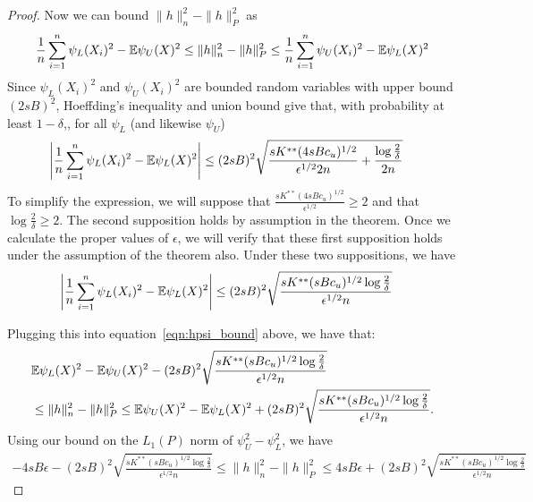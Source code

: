 \begin{proof}
Now we can bound $\| h \|_n^2 - \| h \|_P^2$ as
\begin{align}
\frac{1}{n} \sum_{i=1}^n \psi_L(X_i)^2 - {\mathbb E} \psi_U(X)^2  \leq
    \| h \|_n^2 - \| h \|_P^2 \leq
  \frac{1}{n} \sum_{i=1}^n \psi_U(X_i)^2 - {\mathbb E} \psi_L(X)^2  \label{eqn:hpsi_bound}
\end{align}
Since 
$\psi_L(X_i)^2$ and $\psi_U(X_i)^2$ are bounded random variables with
upper bound $(2sB)^2$, Hoeffding's inequality and union bound give that,
with probability at least $1-\delta$,, for all $\psi_L$ (and likewise $\psi_U$)
\begin{align*}
\left| \frac{1}{n} \sum_{i=1}^n \psi_L(X_i)^2 - 
   {\mathbb E} \psi_L(X)^2 \right| &\leq (2sB)^2 \sqrt{ \frac{sK^{**} (4sBc_u)^{1/2}}{\epsilon^{1/2}2n} + \frac{\log\frac{2}{\delta}}{2n}} 
\end{align*}
To simplify the expression, we will suppose that $\frac{sK^{**} (4sBc_u)^{1/2}}{\epsilon^{1/2}} \geq 2$ and that $\log \frac{2}{\delta} \geq 2$. The second supposition holds by assumption in the theorem. Once we calculate the proper values of $\epsilon$, we will verify that these first supposition holds under the assumption of the theorem also. Under these two suppositions, we have
\begin{align}
\label{eqn:simplified_psi_concentration}
\left| \frac{1}{n} \sum_{i=1}^n \psi_L(X_i)^2 - 
   {\mathbb E} \psi_L(X)^2 \right| &\leq (2sB)^2 \sqrt{ \frac{ sK^{**} (sBc_u)^{1/2} \log \frac{2}{\delta}}{ \epsilon^{1/2} n} }
\end{align}

Plugging this into equation~\eqref{eqn:hpsi_bound} above, we have that:
\begin{align*}
& {\mathbb E} \psi_L(X)^2 - {\mathbb E} \psi_U(X)^2 - 
(2sB)^2 \sqrt{ \frac{ sK^{**} (sBc_u)^{1/2} \log \frac{2}{\delta}}{ \epsilon^{1/2} n} } \\
 & \leq 
 \| h \|_n^2 - \| h \|_P^2 \leq
{\mathbb E} \psi_U(X)^2 - {\mathbb E} \psi_L(X)^2 + 
(2sB)^2 \sqrt{ \frac{ sK^{**} (sBc_u)^{1/2} \log \frac{2}{\delta}}{ \epsilon^{1/2} n} }.
\end{align*}
Using our bound on the $L_1(P)$ norm of $\psi_U^2 - \psi_L^2$, we have
\begin{align*}
-4sB\epsilon - 
(2sB)^2 \sqrt{ \frac{ sK^{**} (sBc_u)^{1/2} \log \frac{2}{\delta}}{ \epsilon^{1/2} n} } \leq 
 \| h \|_n^2 - \| h \|_P^2 \leq
4sB\epsilon + 
(2sB)^2 \sqrt{ \frac{ sK^{**} (sBc_u)^{1/2} \log \frac{2}{\delta}}{ \epsilon^{1/2} n} }
\end{align*}


\end{proof}
